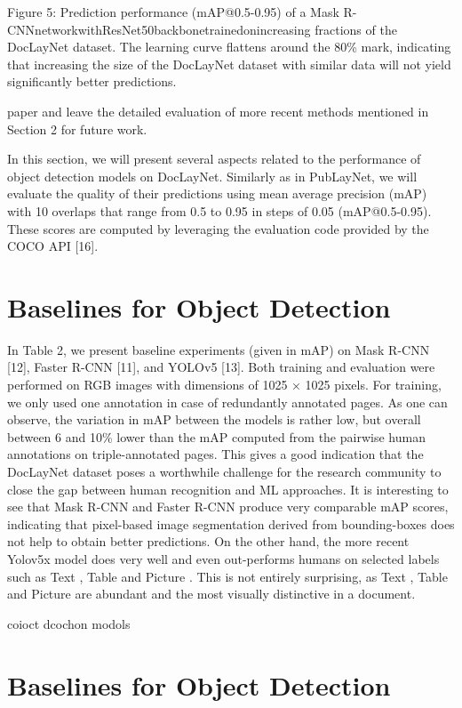 \documentclass[11pt,a4paper]{article}
\begin{document}
Figure 5: Prediction performance (mAP@0.5-0.95) of a Mask R-CNNnetworkwithResNet50backbonetrainedonincreasing fractions of the DocLayNet dataset. The learning curve flattens around the 80\% mark, indicating that increasing the size of the DocLayNet dataset with similar data will not yield significantly better predictions.

paper and leave the detailed evaluation of more recent methods mentioned in Section 2 for future work.

In this section, we will present several aspects related to the performance of object detection models on DocLayNet. Similarly as in PubLayNet, we will evaluate the quality of their predictions using mean average precision (mAP) with 10 overlaps that range from 0.5 to 0.95 in steps of 0.05 (mAP@0.5-0.95). These scores are computed by leveraging the evaluation code provided by the COCO API [16].

\section{Baselines for Object Detection}

In Table 2, we present baseline experiments (given in mAP) on Mask R-CNN [12], Faster R-CNN [11], and YOLOv5 [13]. Both training and evaluation were performed on RGB images with dimensions of 1025 × 1025 pixels. For training, we only used one annotation in case of redundantly annotated pages. As one can observe, the variation in mAP between the models is rather low, but overall between 6 and 10\% lower than the mAP computed from the pairwise human annotations on triple-annotated pages. This gives a good indication that the DocLayNet dataset poses a worthwhile challenge for the research community to close the gap between human recognition and ML approaches. It is interesting to see that Mask R-CNN and Faster R-CNN produce very comparable mAP scores, indicating that pixel-based image segmentation derived from bounding-boxes does not help to obtain better predictions. On the other hand, the more recent Yolov5x model does very well and even out-performs humans on selected labels such as Text , Table and Picture . This is not entirely surprising, as Text , Table and Picture are abundant and the most visually distinctive in a document.

coioct dcochon modols

\section{Baselines for Object Detection}
\end{document}

